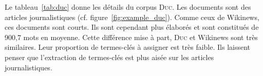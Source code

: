     Le tableau~\ref{tab:duc} donne les détails du corpus \textsc{Duc}. Les
    documents sont des articles journalistiques (cf.
    figure~\ref{fig:example_duc}). Comme ceux de Wikinews, ces documents sont
    courts. Ils sont cependant plus élaborés et sont constitués de 900,7 mots en
    moyenne. Cette différence mise à part, \textsc{Duc} et Wikinews sont très
    similaires. Leur proportion de termes-clés à assigner est très faible. Ils
    laissent penser que l'extraction de termes-clés est plus aisée sur les
    articles journalistiques.

    \begin{table}[!h]
      \centering

      \caption{Corpus \textsc{Duc}
               \label{tab:duc}}
    \end{table}

